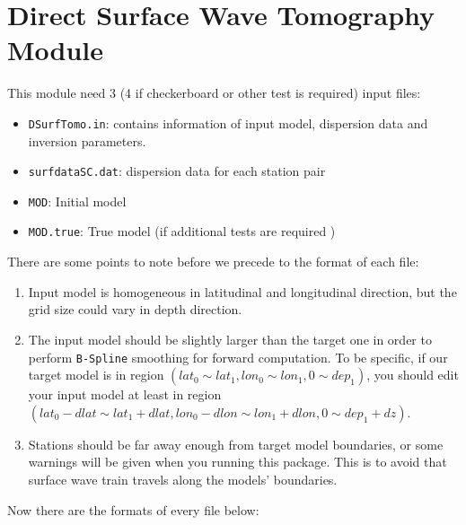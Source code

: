 \documentclass[UTF8]{article}
\begin{document}
\section{Direct Surface Wave Tomography Module} 
This module need 3 (4 if checkerboard or other test 
is required) input files:
\begin{itemize}
\item \verb!DSurfTomo.in!: contains information of 
        input model, dispersion data and inversion 
        parameters.
\item \verb!surfdataSC.dat!: dispersion data for 
            each station pair
\item \verb!MOD!: Initial model
\item \verb!MOD.true!: True model (if 
                        additional tests are required )
\end{itemize}
There are some points to note before we precede to the 
format of each file:
\begin{enumerate}[(1)]
    \item Input model is homogeneous in latitudinal and 
            longitudinal direction, but the grid size 
            could vary in depth direction.
    \item The input model should be slightly larger than
          the target one in order to perform \texttt{B-Spline}
          smoothing for forward computation. To be specific,
         if our target model is in region 
         $(lat_0 \sim lat_1,lon_0\sim lon_1,0\sim dep_1)$, 
        you should edit your input model at least in 
        region $(lat_0-dlat \sim lat_1+dlat, lon_0-dlon \sim lon_1+dlon,0 \sim dep_1+dz)$.
    \item Stations should be far away enough from target model 
            boundaries, or some warnings will be given 
            when you running this package. This is to 
            avoid that surface wave train travels along
            the models' boundaries.
\end{enumerate}
Now there are the formats of every file below:
\end{document}
